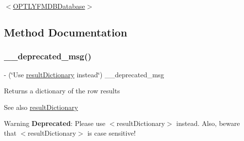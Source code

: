 \begin{DoxyItemize}
\item {\ttfamily $<$\mbox{\hyperlink{interface_o_p_t_l_y_f_m_d_b_database}{O\+P\+T\+L\+Y\+F\+M\+D\+B\+Database}}$>$} 
\end{DoxyItemize}

\subsection{Method Documentation}
\mbox{\label{interface_o_p_t_l_y_f_m_d_b_result_set_a758db86030ebe9ba567e2b37d0914352}} 
\subsubsection{\texorpdfstring{\+\_\+\+\_\+deprecated\+\_\+msg()}{\_\_deprecated\_msg()}}
{\footnotesize\ttfamily -\/ (\char`\"{}Use \mbox{\hyperlink{interface_o_p_t_l_y_f_m_d_b_result_set_ace597b275ab7cc2b3f351aec058ac048}{result\+Dictionary}} instead\char`\"{}) \+\_\+\+\_\+deprecated\+\_\+msg \begin{DoxyParamCaption}{ }\end{DoxyParamCaption}}

Returns a dictionary of the row results

\begin{DoxySeeAlso}{See also}
\mbox{\hyperlink{interface_o_p_t_l_y_f_m_d_b_result_set_ace597b275ab7cc2b3f351aec058ac048}{result\+Dictionary}}
\end{DoxySeeAlso}
\begin{DoxyWarning}{Warning}
{\bfseries Deprecated}\+: Please use {\ttfamily $<$result\+Dictionary$>$} instead. Also, beware that {\ttfamily $<$result\+Dictionary$>$} is case sensitive! 
\end{DoxyWarning}
\mbox{\label{interface_o_p_t_l_y_f_m_d_b_result_set_acc9546fd178b809056eb3fd592c359b9}} 

